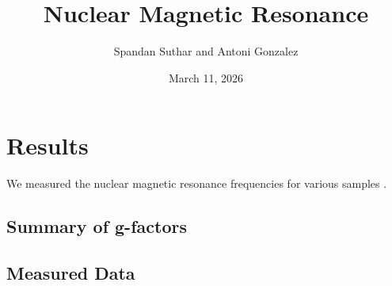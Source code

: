 \documentclass[11pt]{article}
\title{Nuclear Magnetic Resonance}
\author{Spandan Suthar and Antoni Gonzalez}
\date{March 11, 2026}
\begin{document}
\maketitle

\section*{Results}

We measured the nuclear magnetic resonance frequencies for various
samples \cite{dummy2024}.

\subsection*{Summary of g-factors}

\begin{table}[H]
  \centering
  
  \caption{}
  \label{table:g_factor_summary}
\end{table}

\subsection*{Measured Data}

\begin{table}[H]
  \centering
  \begin{minipage}[t]{0.45\textwidth}
    \centering
    
  \end{minipage}
  \hfill
  \begin{minipage}[t]{0.45\textwidth}
    \centering
    
  \end{minipage}
\end{table}

\begin{table}[H]
  \centering
  \begin{minipage}[t]{0.45\textwidth}
    \centering
    
  \end{minipage}
  \hfill
  \begin{minipage}[t]{0.45\textwidth}
    \centering
    
  \end{minipage}
\end{table}

\begin{table}[H]
  \centering
  \begin{minipage}[t]{0.45\textwidth}
    \centering
    
  \end{minipage}
  \hfill
  \begin{minipage}[t]{0.45\textwidth}
    \centering
    
  \end{minipage}
\end{table}
\end{document}
